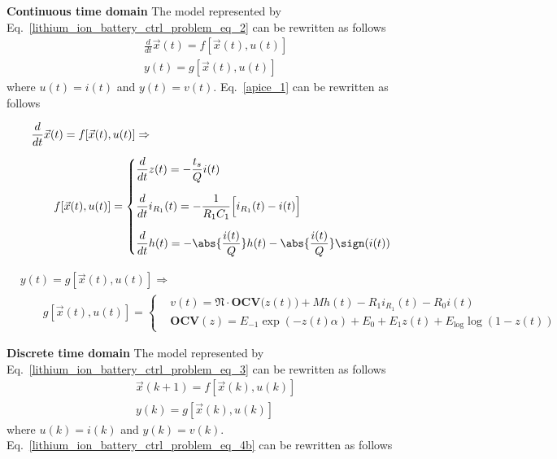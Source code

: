 \documentclass[12pt,a4paper,oneside]{book}
\begin{document}
\begin{onehalfspace}
\vspace{5mm}
\noindent\textbf{Continuous time domain}
The model represented by Eq.~\eqref{lithium_ion_battery_ctrl_problem_eq_2} can 
be rewritten as follows
\begin{equation}
	\begin{aligned}\label{apice_1}
		&\frac{d}{dt}\vec{x}(t)=f[\vec{x}(t),u(t)] \\[6pt]
		&y(t)=g[\vec{x}(t),u(t)]
	\end{aligned}
\end{equation}
where $u(t)=i(t)$ and $y(t)=v(t)$. Eq.~\eqref{apice_1} can be rewritten as 
follows

\begin{equation}
	\begin{aligned}\label{apice_2}
		&\frac{d}{dt}\vec{x}(t)=f[\vec{x}(t),u(t)] \Rightarrow  \\[6pt]
		& \qquad f[\vec{x}(t),u(t)]=
		\left\lbrace \begin{aligned}
			&	\frac{d}{dt}z(t) = -\frac{t_s}{Q}i(t) \\[6pt]
			&	\frac{d}{dt}i_{R_1}(t) = -\frac{1}{R_1C_1}\Big[i_{R_1}(t)-i(t)\Big] \\[6pt]
			&	\frac{d}{dt}h(t) = -\abs{\frac{i(t)}{Q}}h(t) 
			-\abs{\frac{i(t)}{Q}}\sign(i(t))
		\end{aligned}\right.
	\end{aligned}
\end{equation}

\begin{equation}\label{apice_3}
	\begin{aligned}
		&y(t)=g[\vec{x}(t),u(t)] \Rightarrow \\[6pt]
		& \qquad g[\vec{x}(t),u(t)]=
		\left\lbrace \begin{aligned}
			& v(t) = \mathfrak{N}\cdot\mathbf{OCV}\Big(z(t)\Big) +Mh(t)-R_1i_{R_1}(t) - R_0i(t) \\[6pt]
			& \mathbf{OCV}(z) = E_{-1}\exp(-z(t)\alpha) + E_0 + E_1z(t) +  E_\text{log}\log({1-z(t)})
		\end{aligned}\right.
	\end{aligned}
\end{equation}

\vspace{5mm}
\noindent\textbf{Discrete time domain}
The model represented by Eq.~\eqref{lithium_ion_battery_ctrl_problem_eq_3} can be rewritten as follows
\begin{equation}
	\begin{aligned}\label{lithium_ion_battery_ctrl_problem_eq_4b}
		&\vec{x}(k+1)=f[\vec{x}(k),u(k)] \\[6pt]
		&y(k)=g[\vec{x}(k),u(k)]
	\end{aligned}
\end{equation}
where $u(k)=i(k)$ and $y(k)=v(k)$. Eq.~\eqref{lithium_ion_battery_ctrl_problem_eq_4b} can be rewritten as follows


\end{onehalfspace}
\end{document}
